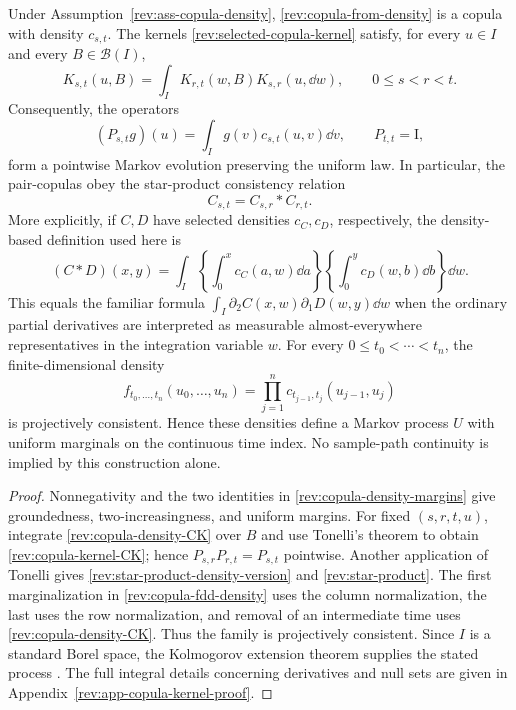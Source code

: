 \begin{proposition}
\label{rev:prop-density-copula-consistency}
Under Assumption~\ref{rev:ass-copula-density},
\eqref{rev:copula-from-density} is a copula with density $c_{s,t}$.
The kernels \eqref{rev:selected-copula-kernel} satisfy, for every $u\in I$ and
every $B\in\mathcal B(I)$,
\begin{equation}
K_{s,t}(u,B)=\int_IK_{r,t}(w,B)K_{s,r}(u,\dd w),
\qquad 0\le s<r<t.
\label{rev:copula-kernel-CK}
\end{equation}
Consequently, the operators
\begin{equation}
(P_{s,t}g)(u)=\int_Ig(v)c_{s,t}(u,v)\dd v,
\qquad P_{t,t}=\mathrm I,
\label{rev:copula-density-operator}
\end{equation}
form a pointwise Markov evolution preserving the uniform law.  In particular,
the pair-copulas obey the star-product consistency relation
\begin{equation}
C_{s,t}=C_{s,r}*C_{r,t}.
\label{rev:star-product}
\end{equation}
More explicitly, if $C,D$ have selected densities $c_C,c_D$, respectively,
the density-based definition used here is
\begin{equation}
(C*D)(x,y)
=\int_I
 \left\{\int_0^x c_C(a,w)\dd a\right\}
 \left\{\int_0^y c_D(w,b)\dd b\right\}\dd w.
\label{rev:star-product-density-version}
\end{equation}
This equals the familiar formula
$\int_I\partial_2C(x,w)\partial_1D(w,y)\dd w$ when the ordinary partial
derivatives are interpreted as measurable almost-everywhere representatives in
the integration variable $w$.
For every $0\le t_0<\cdots<t_n$, the finite-dimensional density
\begin{equation}
f_{t_0,\ldots,t_n}(u_0,\ldots,u_n)
=\prod_{j=1}^{n}c_{t_{j-1},t_j}(u_{j-1},u_j)
\label{rev:copula-fdd-density}
\end{equation}
is projectively consistent.  Hence these densities define a Markov process
$U$ with uniform marginals on the continuous time index.  No sample-path
continuity is implied by this construction alone.
\end{proposition}

\begin{proof}
Nonnegativity and the two identities in
\eqref{rev:copula-density-margins} give groundedness, two-increasingness, and
uniform margins.  For fixed $(s,r,t,u)$, integrate
\eqref{rev:copula-density-CK} over $B$ and use Tonelli's theorem to obtain
\eqref{rev:copula-kernel-CK}; hence $P_{s,r}P_{r,t}=P_{s,t}$ pointwise.
Another application of Tonelli gives
\eqref{rev:star-product-density-version} and \eqref{rev:star-product}.
The first marginalization in \eqref{rev:copula-fdd-density} uses the column
normalization, the last uses the row normalization, and removal of an
intermediate time uses \eqref{rev:copula-density-CK}.  Thus the family is
projectively consistent.  Since $I$ is a standard Borel space, the
Kolmogorov extension theorem supplies the stated process
\citep[Chapter~8]{Kallenberg2021}.  The full integral details concerning
derivatives and null sets are given in
Appendix~\ref{rev:app-copula-kernel-proof}.
\end{proof}


